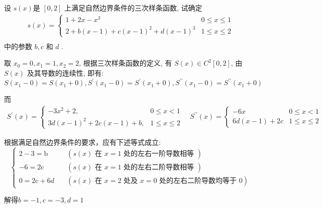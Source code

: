   \begin{tcolorbox}[enhanced,colback=10,colframe=9,breakable,coltitle=green!25!black,title=2024]
  
设 $s(x)$是 $[0,2]$ 上满足自然边界条件的三次样条函数, 试确定
$$
\begin{array}{l}
s(x)=\left\{\begin{array}{ll}
1+2 x-x^{3} & 0 \leqslant x \leqslant 1 \\
2+b(x-1)+c(x-1)^{2}+d(x-1)^{3} & 1 \leqslant x \leqslant 2
\end{array}\right. \\
\end{array}
$$
 中的参数  $b, c$ 和 $ d$ .


 \tcblower
取 $ x_{0}=0, x_{1}=1, x_{2}=2 $, 根据三次样条函数的定义, 有 $ S(x) \in C^{2}[0,2] $, 由 $ S(x) $ 及其导数的连续性, 即有: 
$$ S\left(x_{1}-0\right)=S\left(x_{1}+0\right), S^{\prime}\left(x_{1}-0\right)=S^{\prime}\left(x_{1}+0\right), S^{\prime \prime}\left(x_{1}-0\right)=S^{\prime \prime}\left(x_{1}+0\right) $$ 

而$ \begin{array}{l}S^{\prime}(x)=\left\{\begin{array}{ll}-3x^{2}+2 , &0 \leqslant x<1 \\ 3d(x-1)^{2}+2 c(x-1)+b,  &1 \leqslant x \leqslant 2\end{array}\right. \quad S^{\prime \prime}(x)=\left\{\begin{array}{ll}-6 x & 0 \leqslant x<1 \\ 6d(x-1)+2 c & 1 \leqslant x \leqslant 2\end{array}\right. \end{array} $

根据满足自然边界条件的要求，应有下述等式成立:
$$
\left\{\begin{array}{ll}
2-3=\mathrm{b} \quad&(s(x) \text { 在 } x=1 \text { 处的左右一阶导数相等 }) \\
-6=2 \mathrm{c} \quad&(s(x) \text { 在 } x=1 \text { 处的左右二阶导数相等 }) \\
0=2 \mathrm{c}+6 d \quad&(s(x) \text { 在 } x=2 \text { 处及 } x=0 \text { 处的左右二阶导数均等于 } 0)
\end{array}\right.
$$

解得$b=-1, c=-3,d=1$

\end{tcolorbox}

